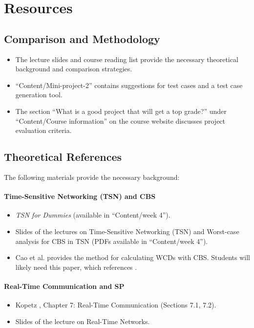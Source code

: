 \documentclass[a4paper,11pt]{article}
\begin{document}
\section{Resources}

\subsection*{Comparison and Methodology}
\begin{itemize}
    \item The lecture slides and course reading list provide the necessary theoretical background and comparison strategies.    
    \item ``Content/Mini-project-2'' contains suggestions for test cases and a test case generation tool.
    \item The section ``What is a good project that will get a top grade?'' under ``Content/Course information'' on the course website discusses project evaluation criteria.
\end{itemize}

\subsection*{Theoretical References}
The following materials provide the necessary background:

\paragraph{Time-Sensitive Networking (TSN) and CBS}
\begin{itemize}
    \item {\em TSN for Dummies} (available in ``Content/week 4'').
    \item Slides of the lectures on Time-Sensitive Networking (TSN) and Worst-case analysis for CBS in TSN (PDFs available in ``Content/week 4'').
    \item Cao et al. \cite{Cao2016-IndependentTightWCRT} provides the method for calculating WCDs with CBS. Students will likely need this paper, which references \cite{Cao2016-TightWorstcaseResponsetimea}.
\end{itemize}

\paragraph{Real-Time Communication and SP}
\begin{itemize}
    \item Kopetz \cite{kopetz2011}, Chapter 7: Real-Time Communication (Sections 7.1, 7.2).
    \item Slides of the lecture on Real-Time Networks.
\end{itemize}
\end{document}
